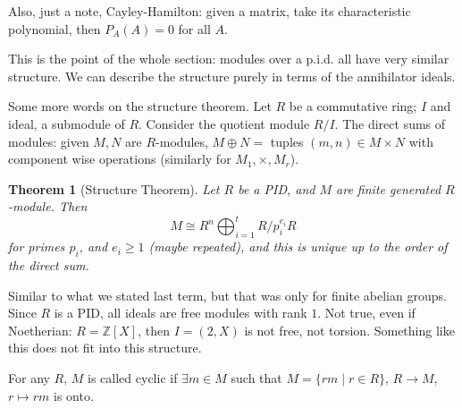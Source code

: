 \documentclass{article}
\theoremstyle{plain}
\newtheorem{theorem}{Theorem}
\theoremstyle{remark}
\newcommand{\Z}{{\mathbb Z}}
\begin{document}
Also, just a note, Cayley-Hamilton:
given a matrix, take its characteristic polynomial,
then $P_A(A) = 0$ for all $A$.

This is the point of the whole section:
modules over a p.i.d. all have very similar structure.
We can describe the structure purely in terms of the annihilator ideals.

Some more words on the structure theorem.
Let $R$ be a commutative ring; $I$ and ideal, a submodule of $R$.
Consider the quotient module $R/I$.
The direct sums of modules:
given $M,N$ are $R$-modules,
$M \oplus N =$ tuples $(m,n) \in M \times N$ with component wise operations
(similarly for $M_1,\times,M_r$).
\begin{theorem}[Structure Theorem]
	Let $R$ be a PID,
	and $M$ are finite generated $R$-module. Then
	\[
		M \cong R^n \bigoplus_{i=1}^t R/p_i^{e_i}R
	\]
	for primes $p_i$, and $e_i \geq 1$ (maybe repeated),
	and this is unique up to the order of the direct sum.
\end{theorem}
Similar to what we stated last term, but that was only for finite abelian groups.
Since $R$ is a PID, all ideals are free modules with rank $1$.
Not true, even if Noetherian: $R = \Z[X]$, then $I = (2,X)$ is not free, not torsion.
Something like this does not fit into this structure.

For any $R$, $M$ is called cyclic if $\exists m \in M$ such that
$M = \{rm \mid r \in R\}$, $R \to M$, $r \mapsto rm$ is onto.
\end{document}
